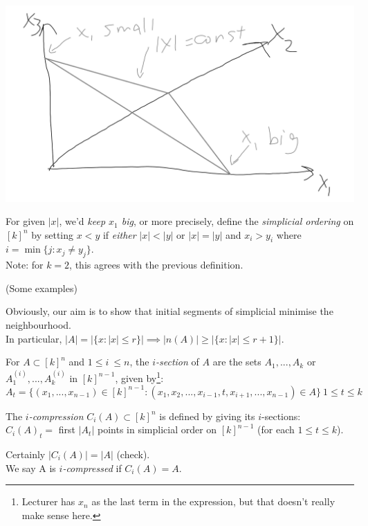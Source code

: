 \documentclass[a4paper]{article}
\begin{document}
\includegraphics[scale=0.5]{image/Comb_04.png}

For given $|x|$, we'd \emph{keep $x_1$ big}, or more precisely, define the \emph{simplicial ordering} on $[k]^n$ by setting $x<y$ if \emph{either} $|x| < |y|$ or $|x| = |y|$ and $x_i > y_i$ where $i = \min\{j:x_j \neq y_j\}$.\\
Note: for $k=2$, this agrees with the previous definition.

(Some examples)

Obviously, our aim is to show that initial segments of simplicial minimise the neighbourhood.\\
In particular, $|A| = |\{x:|x| \leq r\}| \implies |n(A)| \geq |\{x:|x|\leq r+1\}|$.

For $A \subset [k]^n$ and $1 \leq i\ \leq n$, the \emph{$i$-section} of $A$ are the sets $A_1,...,A_k$ or $A_1^{(i)},...,A_k^{(i)}$ in $[k]^{n-1}$, given by\footnote{Lecturer has $x_n$ as the last term in the expression, but that doesn't really make sense here.}:\\
$$A_t = \{(x_1,...,x_{n-1}) \in [k]^{n-1}: (x_1,x_2,...,x_{i-1},t,x_{i+1},...,x_{n-1}) \in  A\}\ 1 \leq t \leq k$$

The \emph{$i$-compression} $C_i(A) \subset [k]^n$ is defined by giving its $i$-sections:\\
$C_i(A)_t =$ first $|A_t|$ points in simplicial order on $[k]^{n-1}$ (for each $1 \leq t \leq k$).

Certainly $|C_i(A)| = |A|$ (check).\\
We say A is \emph{$i$-compressed} if $C_i(A) = A$.
\end{document}
